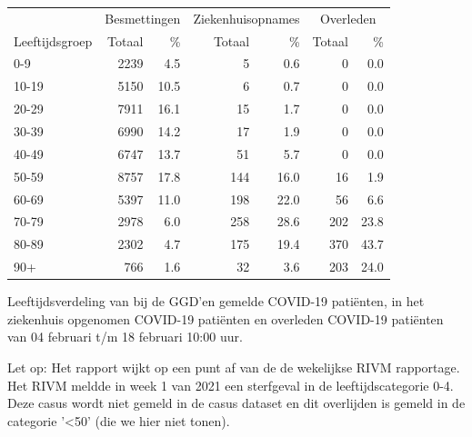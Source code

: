 \documentclass[
  english,
  man,floatsintext]{apa6}
\begin{document}
\begin{table}[H]
\centering\begingroup\fontsize{11}{13}\selectfont

\begin{threeparttable}
\begin{tabular}{lrrrrrr}
\toprule
\multicolumn{1}{c}{ } & \multicolumn{2}{c}{Besmettingen} & \multicolumn{2}{c}{Ziekenhuisopnames} & \multicolumn{2}{c}{Overleden} \\
\cmidrule(l{3pt}r{3pt}){2-3} \cmidrule(l{3pt}r{3pt}){4-5} \cmidrule(l{3pt}r{3pt}){6-7}
Leeftijdsgroep & Totaal & \% & Totaal & \% & Totaal & \%\\
\midrule
0-9 & 2239 & 4.5 & 5 & 0.6 & 0 & 0.0\\
10-19 & 5150 & 10.5 & 6 & 0.7 & 0 & 0.0\\
20-29 & 7911 & 16.1 & 15 & 1.7 & 0 & 0.0\\
30-39 & 6990 & 14.2 & 17 & 1.9 & 0 & 0.0\\
40-49 & 6747 & 13.7 & 51 & 5.7 & 0 & 0.0\\
50-59 & 8757 & 17.8 & 144 & 16.0 & 16 & 1.9\\
60-69 & 5397 & 11.0 & 198 & 22.0 & 56 & 6.6\\
70-79 & 2978 & 6.0 & 258 & 28.6 & 202 & 23.8\\
80-89 & 2302 & 4.7 & 175 & 19.4 & 370 & 43.7\\
90+ & 766 & 1.6 & 32 & 3.6 & 203 & 24.0\\
\bottomrule
\end{tabular}
\begin{tablenotes}
\item[1] Leeftijdsverdeling van bij de GGD’en gemelde COVID-19 patiënten, in het ziekenhuis opgenomen COVID-19 patiënten en overleden COVID-19 patiënten van 04 februari t/m 18 februari 10:00 uur.
\item[2] Let op: Het rapport wijkt op een punt af van de de wekelijkse RIVM rapportage. Het RIVM meldde in week 1 van 2021 een sterfgeval in de leeftijdscategorie 0-4. Deze casus wordt niet gemeld in de casus dataset en dit overlijden is gemeld in de categorie '<50' (die we hier niet tonen).
\end{tablenotes}
\end{threeparttable}
\endgroup{}
\end{table}

\newpage
\end{document}
